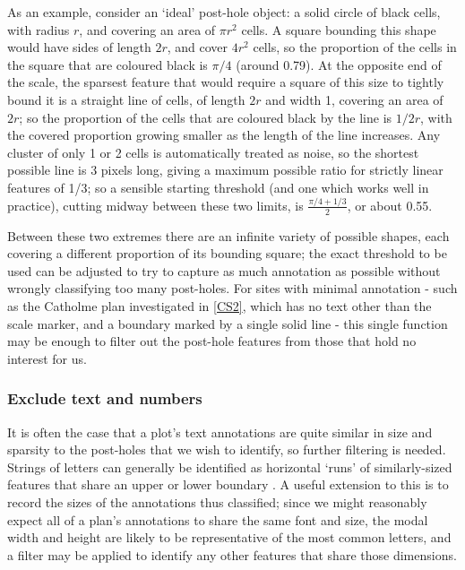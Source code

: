 \documentclass[../../ArchStats.tex]{subfiles}
\begin{document}
As an example, consider an `ideal' post-hole object: a solid circle of black cells, with radius $r$, and covering an area of $\pi r^2$ cells. A square bounding this shape would have sides of length $2r$, and cover $4r^2$ cells, so the proportion of the cells in the square that are coloured black is $\pi/4$ (around 0.79). At the opposite end of the scale, the sparsest feature that would require a square of this size to tightly bound it is a straight line of cells, of length $2r$ and width 1, covering an area of $2r$; so the proportion of the cells that are coloured black by the line is $1/2r$, with the covered proportion growing smaller as the length of the line increases. Any cluster of only 1 or 2 cells is automatically treated as noise, so the shortest possible line is 3 pixels long, giving a maximum possible ratio for strictly linear features of 1/3; so a sensible starting threshold (and one which works well in practice), cutting midway between these two limits, is $\frac{\pi/4+1/3}{2}$, or about 0.55. 

Between these two extremes there are an infinite variety of possible shapes, each covering a different proportion of its bounding square; the exact threshold to be used can be adjusted to try to capture as much annotation as possible without wrongly classifying too many post-holes. For sites with minimal annotation - such as the Catholme plan investigated in \ref{CS2}, which has no text other than the scale marker, and a boundary marked by a single solid line - this single function may be enough to filter out the post-hole features from those that hold no interest for us. \nb{!}

\subsubsection{Exclude text and numbers}

It is often the case that a plot's text annotations are quite similar in size and sparsity to the post-holes that we wish to identify, so further filtering is needed. Strings of letters can generally be identified as horizontal `runs' of similarly-sized features that share an upper or lower boundary . A useful extension to this is to record the sizes of the annotations thus classified; since we might reasonably expect all of a plan's annotations to share the same font and size, the modal width and height are likely to be representative of the most common letters, and a filter may be applied to identify any other features that share those dimensions. 
\end{document}
